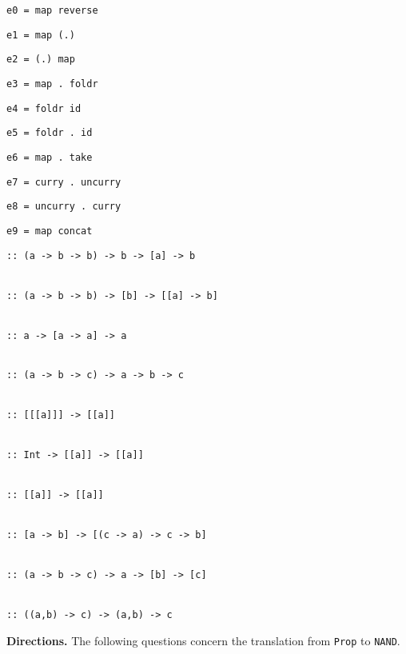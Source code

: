 \documentclass[12pt]{article}
\begin{document}
\begin{enumerate}
\begin{minipage}{2.5in}
\item \verb+e0 = map reverse+
\vspace{3ex}
\item \verb+e1 = map (.)+
\vspace{3ex}
\item \verb+e2 = (.) map+
\vspace{3ex}
\item \verb+e3 = map . foldr+
\vspace{3ex}
\item \verb+e4 = foldr id+
\vspace{3ex}
\item \verb+e5 = foldr . id+
\vspace{3ex}
\item \verb+e6 = map . take+
\vspace{3ex}
\item \verb+e7 = curry . uncurry+
\vspace{3ex}
\item \verb+e8 = uncurry . curry+
\vspace{3ex}
\item \verb+e9 = map concat+
\end{minipage}
\hspace{1in}
\begin{minipage}{2in}
\begin{verbatim}
:: (a -> b -> b) -> b -> [a] -> b


:: (a -> b -> b) -> [b] -> [[a] -> b]


:: a -> [a -> a] -> a


:: (a -> b -> c) -> a -> b -> c


:: [[[a]]] -> [[a]]


:: Int -> [[a]] -> [[a]]


:: [[a]] -> [[a]]


:: [a -> b] -> [(c -> a) -> c -> b]


:: (a -> b -> c) -> a -> [b] -> [c]


:: ((a,b) -> c) -> (a,b) -> c
\end{verbatim}
\end{minipage}

\newpage
\item[] {\bf Directions.} The following questions concern the translation from {\tt Prop} to {\tt NAND}.


\end{enumerate}
\end{document}
